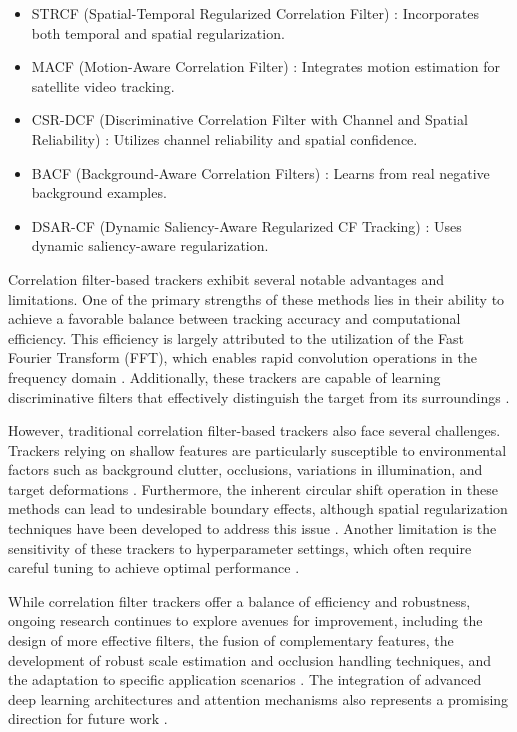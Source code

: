 \begin{itemize}
    \item STRCF (Spatial-Temporal Regularized Correlation Filter) \cite{lin2024motion}: Incorporates both temporal and spatial regularization.
    
    \item MACF (Motion-Aware Correlation Filter) \cite{lin2024motion}: Integrates motion estimation for satellite video tracking.
    
    \item CSR-DCF (Discriminative Correlation Filter with Channel and Spatial Reliability) \cite{lin2024motion}: Utilizes channel reliability and spatial confidence.
    
    \item BACF (Background-Aware Correlation Filters) \cite{zhao2020correlation}: Learns from real negative background examples.
    
    \item DSAR-CF (Dynamic Saliency-Aware Regularized CF Tracking) \cite{feng2019dynamic}: Uses dynamic saliency-aware regularization.
\end{itemize}


Correlation filter-based trackers exhibit several notable advantages and limitations. One of the primary strengths of these methods lies in their ability to achieve a favorable balance between tracking accuracy and computational efficiency. This efficiency is largely attributed to the utilization of the Fast Fourier Transform (FFT), which enables rapid convolution operations in the frequency domain \cite{feng2019dynamic}. Additionally, these trackers are capable of learning discriminative filters that effectively distinguish the target from its surroundings \cite{qiu2024boundary}.

However, traditional correlation filter-based trackers also face several challenges. Trackers relying on shallow features are particularly susceptible to environmental factors such as background clutter, occlusions, variations in illumination, and target deformations \cite{feng2019dynamic}\cite{du2021overview}\cite{zhao2020correlation}. Furthermore, the inherent circular shift operation in these methods can lead to undesirable boundary effects, although spatial regularization techniques have been developed to address this issue \cite{feng2019dynamic}. Another limitation is the sensitivity of these trackers to hyperparameter settings, which often require careful tuning to achieve optimal performance \cite{du2021overview}.

While correlation filter trackers offer a balance of efficiency and robustness, ongoing research continues to explore avenues for improvement, including the design of more effective filters, the fusion of complementary features, the development of robust scale estimation and occlusion handling techniques, and the adaptation to specific application scenarios \cite{du2021overview}\cite{zhao2020correlation}. The integration of advanced deep learning architectures and attention mechanisms also represents a promising direction for future work \cite{qiu2024boundary}.


